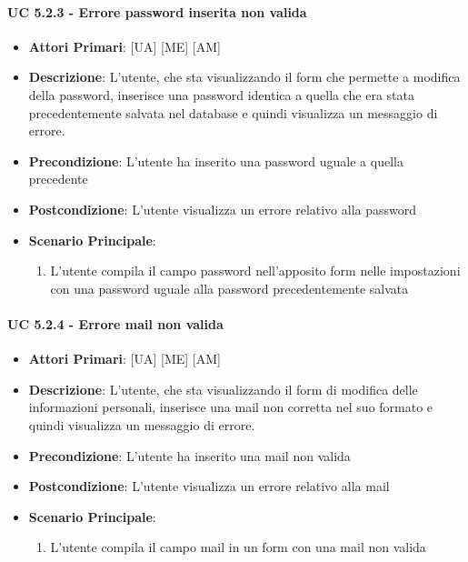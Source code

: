 			\paragraph{UC 5.2.3 - Errore password inserita non valida}
			\begin{itemize}
				\item \textbf{Attori Primari}: [UA] [ME] [AM]
				\item \textbf{Descrizione}: L'utente, che sta visualizzando il form che permette a modifica della password, inserisce una password identica a quella che era stata precedentemente salvata nel database e quindi visualizza un messaggio di errore.
				\item \textbf{Precondizione}: L'utente ha inserito una password uguale a quella precedente
				\item \textbf{Postcondizione}: L'utente visualizza un errore relativo alla password
				\item \textbf{Scenario Principale}:
				\begin{enumerate}
					\item{L'utente compila il campo password nell'apposito form nelle impostazioni con una password uguale alla password precedentemente salvata}
				\end{enumerate}	
			\end{itemize}

			\paragraph{UC 5.2.4 - Errore mail non valida}
			\begin{itemize}
				\item \textbf{Attori Primari}: [UA] [ME] [AM]
				\item \textbf{Descrizione}: L'utente, che sta visualizzando il form di modifica delle informazioni personali, inserisce una mail non corretta nel suo formato e quindi visualizza un messaggio di errore.
				\item \textbf{Precondizione}: L'utente ha inserito una mail non valida
				\item \textbf{Postcondizione}: L'utente visualizza un errore relativo alla mail
				\item \textbf{Scenario Principale}:
				\begin{enumerate}
					\item{L'utente compila il campo mail in un form con una mail non valida}
				\end{enumerate}	
			\end{itemize}

